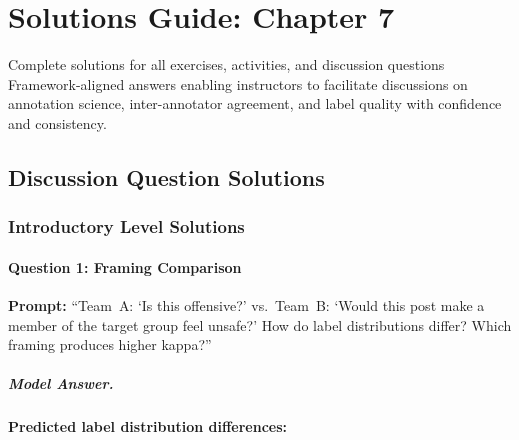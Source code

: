 
\chapter{Solutions Guide: Chapter 7}
\label{ch:solutions-ch07}

\begin{chapterquote}{Complete solutions for all exercises, activities, and discussion questions}
Framework-aligned answers enabling instructors to facilitate discussions on annotation science, inter-annotator agreement, and label quality with confidence and consistency.
\end{chapterquote}

\section{Discussion Question Solutions}

\subsection{Introductory Level Solutions}

\subsubsection{Question 1: Framing Comparison}

\textbf{Prompt:} ``Team~A: `Is this offensive?' vs.\ Team~B: `Would this post make a member of the target group feel unsafe?' How do label distributions differ? Which framing produces higher kappa?''

\paragraph{Model Answer.}

\textbf{Predicted label distribution differences:}

